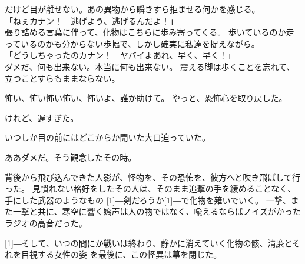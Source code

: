 \documentclass[../IHMain]{subfiles}
\begin{document}
だけど目が離せない。あの異物から瞬きすら拒ませる何かを感じる。\\
「ねぇカナン！　逃げよう、逃げるんだよ！」\\
張り詰める言葉に伴って、化物はこちらに歩み寄ってくる。
歩いているのか走っているのかも分からない歩幅で、しかし確実に私達を捉えながら。\\
「どうしちゃったのカナン！　ヤバイよあれ、早く、早く！」\\
ダメだ、何も出来ない。本当に何も出来ない。
震える脚は歩くことを忘れて、立つことすらもままならない。

怖い、怖い怖い怖い、怖いよ、誰か助けて。
やっと、恐怖心を取り戻した。

けれど、遅すぎた。

いつしか目の前にはどこからか開いた大口迫っていた。

ああダメだ。そう観念したその時。

背後から飛び込んできた人影が、怪物を、その恐怖を、彼方へと吹き飛ばして行った。
見慣れない格好をしたその人は、そのまま追撃の手を緩めることなく、手にした武器のようなもの
\scalebox{3}[1]{―}剣だろうか\scalebox{3}[1]{―}で化物を薙いでいく。
一撃、また一撃と共に、寒空に響く嬌声は人の物ではなく、喩えるならばノイズがかったラジオの高音だった。

\scalebox{3}[1]{―}そして、いつの間にか戦いは終わり、静かに消えていく化物の骸、清廉とそれを目視する女性の姿
を最後に、この怪異は幕を閉じた。
\end{document}
